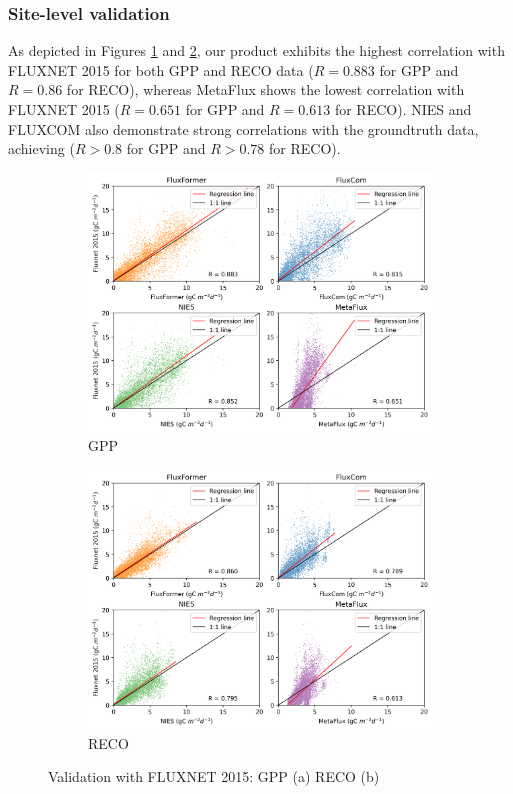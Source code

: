 \subsubsection*{Site-level validation}
As depicted in Figures \ref{fig:chap6_fig3a} and \ref{fig:chap6_fig3b}, our product exhibits the highest correlation with FLUXNET 2015 for both GPP and RECO data ($R = 0.883$ for GPP and $R = 0.86$ for RECO), whereas MetaFlux shows the lowest correlation with FLUXNET 2015 ($R = 0.651$ for GPP and $R = 0.613$ for RECO). NIES and FLUXCOM also demonstrate strong correlations with the groundtruth data, achieving ($R > 0.8$ for GPP and $R > 0.78$ for RECO). \par
\begin{figure}[tbh!]
    \centering
    \begin{subfigure}{\textwidth}
      \centering
      \includegraphics[width=.8\textwidth]{figs/chap6/val_fluxnet_all_GPP.png}
      \caption{GPP}
      \label{fig:chap6_fig3a}
    \end{subfigure}

    \begin{subfigure}{\textwidth}
      \centering
      \includegraphics[width=.8\textwidth]{figs/chap6/val_fluxnet_all_RECO.png}
      \caption{RECO}
      \label{fig:chap6_fig3b}
    \end{subfigure}
    \caption[Validation with FLUXNET 2015]{Validation with FLUXNET 2015: GPP (a) RECO (b)}
    \label{fig:chap6_fig3}
\end{figure}
